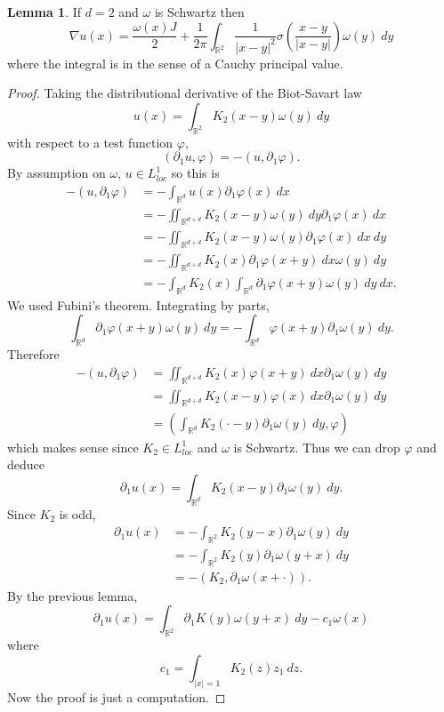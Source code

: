 \documentclass[12pt]{book}
\newcommand{\RR}{\mathbb{R}}
\theoremstyle{definition}
\newtheorem{lemma}[theorem]{Lemma}
\begin{document}
\begin{lemma}
If $d = 2$ and $\omega$ is Schwartz then
$$\nabla u(x) = \frac{\omega(x)J}{2} + \frac{1}{2\pi} \int_{\RR^2} \frac{1}{|x - y|^2}\sigma\left(\frac{x - y}{|x -y|}\right) \omega(y) ~dy$$
where the integral is in the sense of a Cauchy principal value.
\end{lemma}
\begin{proof}
Taking the distributional derivative of the Biot-Savart law
$$u(x) = \int_{\RR^2} K_2(x - y) \omega(y) ~dy$$
with respect to a test function $\varphi$,
$$(\partial_1 u, \varphi) = -(u, \partial_1 \varphi).$$
By assumption on $\omega$, $u \in L^1_{loc}$ so this is
\begin{align*}
-(u, \partial_1 \varphi) &= -\int_{\RR^d} u(x) \partial_1 \varphi(x) ~dx\\
&= -\iint_{\RR^{d + d}} K_2(x - y) \omega(y) ~dy \partial_1 \varphi(x) ~dx \\
&= - \iint_{\RR^{d + d}} K_2(x - y) \omega(y) \partial_1 \varphi(x) ~dx ~dy\\
&= -\iint_{\RR^{d + d}} K_2(x) \partial_1 \varphi(x + y) ~dx \omega(y) ~dy\\
&= -\int_{\RR^d} K_2(x) \int_{\RR^d} \partial_1 \varphi(x + y) \omega(y) ~dy ~dx.
\end{align*}
We used Fubini's theorem.
Integrating by parts,
$$\int_{\RR^d} \partial_1 \varphi(x + y) \omega(y) ~dy = -\int_{\RR^d} \varphi(x + y) \partial_1 \omega(y) ~dy.$$
Therefore
\begin{align*}
-(u, \partial_1 \varphi) &= \iint_{\RR^{d + d}} K_2(x) \varphi(x + y) ~dx \partial_1 \omega(y) ~dy\\
&= \iint_{\RR^{d + d}} K_2(x - y) \varphi(x) ~dx \partial_1 \omega(y) ~dy\\
&= (\int_{\RR^d} K_2(\cdot - y) \partial_1 \omega(y) ~dy, \varphi)
\end{align*}
which makes sense since $K_2 \in L^1_{loc}$ and $\omega$ is Schwartz.
Thus we can drop $\varphi$ and deduce
$$\partial_1 u(x) = \int_{\RR^d} K_2(x - y) \partial_1 \omega(y) ~dy.$$
Since $K_2$ is odd,
\begin{align*}
\partial_1 u(x) &= -\int_{\RR^2} K_2(y - x) \partial_1 \omega(y) ~dy\\
&= -\int_{\RR^2} K_2(y) \partial_1 \omega(y + x) ~dy\\
&= -(K_2, \partial_1 \omega(x + \cdot)).
\end{align*}
By the previous lemma,
$$\partial_1 u(x) = \int_{\RR^2} \partial_1 K(y) \omega(y + x) ~dy - c_1\omega(x)$$
where
$$c_1 = \int_{|x| = 1} K_2(z) z_1 ~dz.$$
Now the proof is just a computation.
\end{proof}
\end{document}
